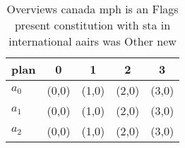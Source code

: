 \documentclass[a4paper]{article}
\begin{document}
\begin{table}
\begin{adjustbox}{width=0.5\columnwidth}
\begin{tabular}{|l|l|l|l|l|}
\hline
\textbf{plan} & \multicolumn{1}{c|}{\textbf{0}} & \multicolumn{1}{c|}{\textbf{1}} & \multicolumn{1}{c|}{\textbf{2}} & \multicolumn{1}{c|}{\textbf{3}} \\ \hline
\textbf{$a_0$}  & (0,0) & (1,0) & (2,0) & (3,0) \\ \hline
\textbf{$a_1$}  & (0,0) & (1,0) & (2,0) & (3,0) \\ \hline
\textbf{$a_2$}  & (0,0) & (1,0) & (2,0) & (3,0) \\ \hline
\end{tabular}
\end{adjustbox}
\caption{Overviews canada mph is an Flags present constitution with sta in international aairs was Other new
}
\end{table}
\end{document}
